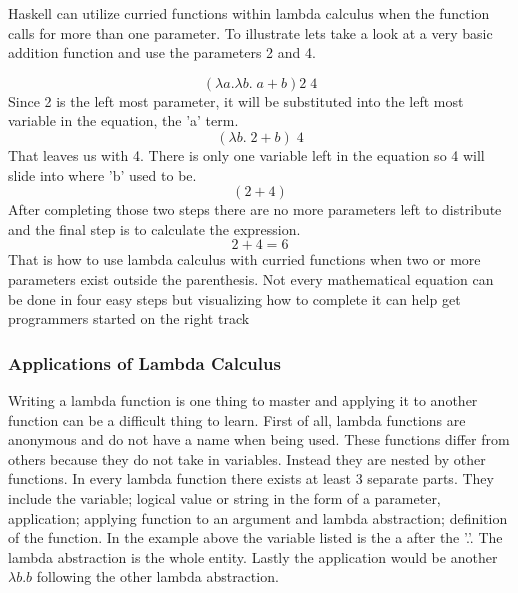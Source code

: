 \documentclass{article}
\begin{document}
    Haskell can utilize curried functions within lambda calculus when the function calls for more than one parameter. To illustrate lets take a look at a very basic addition function and use the parameters 2 and 4.
    
    $$(\lambda a. \lambda b. \;a + b)2\; 4$$
   Since 2 is the left most parameter, it will be substituted into the left most variable in the equation, the 'a' term.
   $$(\lambda b. \;2 + b)\; 4$$
   That leaves us with 4. There is only one variable left in the equation so 4 will slide into where 'b' used to be.
   $$(2 + 4)$$
   After completing those two steps there are no more parameters left to distribute and the final step is to calculate the expression.
   $$2 + 4 = 6$$
   That is how to use lambda calculus with curried functions when two or more parameters exist outside the parenthesis. Not every mathematical equation can be done in four easy steps but visualizing how to complete it can help get programmers started on the right track
    
        \subsubsection{Applications of Lambda Calculus}
        Writing a lambda function is one thing to master and applying it to another function can be a difficult thing to learn. First of all, lambda functions are anonymous and do not have a name when being used. These functions differ from others because they do not take in variables. Instead they are nested by other functions. In every lambda function there exists at least 3 separate parts. They include the variable; logical value or string in the form of a parameter, application; applying function to an argument and lambda abstraction; definition of the function. In the example above the variable listed is the a after the '.'. The lambda abstraction is the whole entity. Lastly the application would be another $\lambda b.b$ following the other lambda abstraction. 
        
\end{document}
